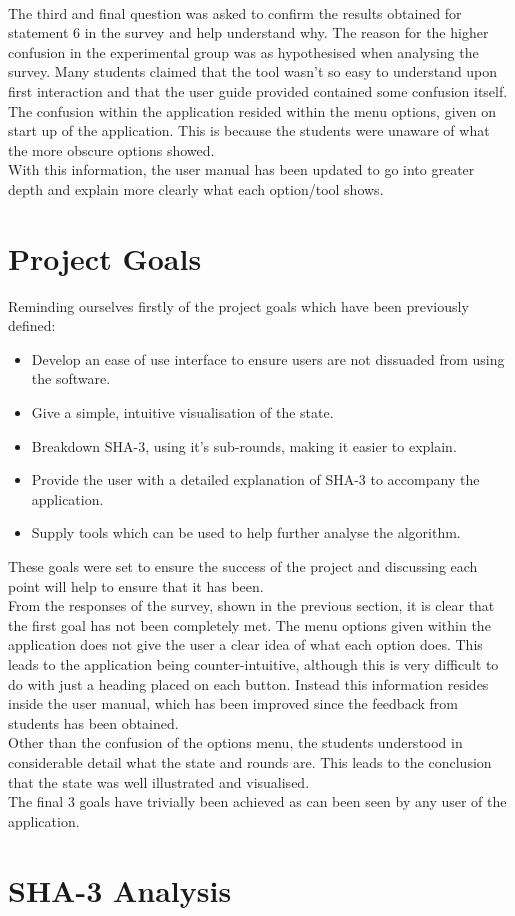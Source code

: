 \vspace{5mm}\\
The third and final question was asked to confirm the results obtained for statement 6 in the survey and help understand why. The reason for the higher confusion in the experimental group was as hypothesised when analysing the survey. Many students claimed that the tool wasn't so easy to understand upon first interaction and that the user guide provided contained some confusion itself. The confusion within the application resided within the menu options, given on start up of the application. This is because the students were unaware of what the more obscure options showed.
\vspace{5mm}\\
With this information, the user manual has been updated to go into greater depth and explain more clearly what each option/tool shows.
\section{Project Goals}
Reminding ourselves firstly of the project goals which have been previously defined:
\begin{itemize}
\item Develop an ease of use interface to ensure users are not dissuaded from using the software.
\item Give a simple, intuitive visualisation of the state. 
\item Breakdown SHA-3, using it's sub-rounds, making it easier to explain.
\item Provide the user with a detailed explanation of SHA-3 to accompany the application.
\item Supply tools which can be used to help further analyse the algorithm.
\end{itemize}
These goals were set to ensure the success of the project and discussing each point will help to ensure that it has been.
\vspace{5mm}\\
From the responses of the survey, shown in the previous section, it is clear that the first goal has not been completely met. The menu options given within the application does not give the user a clear idea of what each option does. This leads to the application being counter-intuitive, although this is very difficult to do with just a heading placed on each button. Instead this information resides inside the user manual, which has been improved since the feedback from students has been obtained.
\vspace{5mm}\\
Other than the confusion of the options menu, the students understood in considerable detail what the state and rounds are. This leads to the conclusion that the state was well illustrated and visualised.
\vspace{5mm}\\
The final 3 goals have trivially been achieved as can been seen by any user of the application.
\section{SHA-3 Analysis}
